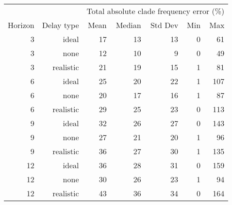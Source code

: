 
\begin{tabular*}{0.7\textwidth}{rrrrrrr}
\toprule
        &            & \multicolumn{5}{c}{Total absolute clade frequency error (\%)} \\
Horizon & Delay type & Mean & Median & Std Dev & Min & Max \\
\midrule

3 & ideal & 17 & 13 & 13 & 0 & 61 \\
3 & none & 12 & 10 & 9 & 0 & 49 \\
3 & realistic & 21 & 19 & 15 & 1 & 81 \\
6 & ideal & 25 & 20 & 22 & 1 & 107 \\
6 & none & 20 & 17 & 16 & 1 & 87 \\
6 & realistic & 29 & 25 & 23 & 0 & 113 \\
9 & ideal & 32 & 26 & 27 & 0 & 143 \\
9 & none & 27 & 21 & 20 & 1 & 96 \\
9 & realistic & 36 & 27 & 30 & 1 & 135 \\
12 & ideal & 36 & 28 & 31 & 0 & 159 \\
12 & none & 30 & 26 & 23 & 1 & 94 \\
12 & realistic & 43 & 36 & 34 & 0 & 164 \\

\bottomrule
\end{tabular*}

